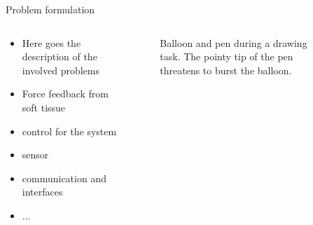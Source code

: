 \documentclass[
xcolor=dvipsnames,
aspectratio=169,
9pt,
]{beamer}
\begin{document}
\begin{frame}{Problem formulation}
	\begin{columns}
		\begin{column}{0.4\textwidth}
			\begin{itemize}
				\item Here goes the description of the involved problems
				\item Force feedback from soft tissue
				\item control for the system
				\item sensor
				\item communication and interfaces
				\item ...
			\end{itemize}
		\end{column}
		\begin{column}{0.6\textwidth}
			\begin{center}
				\begin{figure}
					\caption{Balloon and pen during a drawing task. The pointy tip of the pen threatens to burst the balloon.}
				\end{figure}
			\end{center}
		\end{column}
	\end{columns}
\end{frame}
\end{document}
